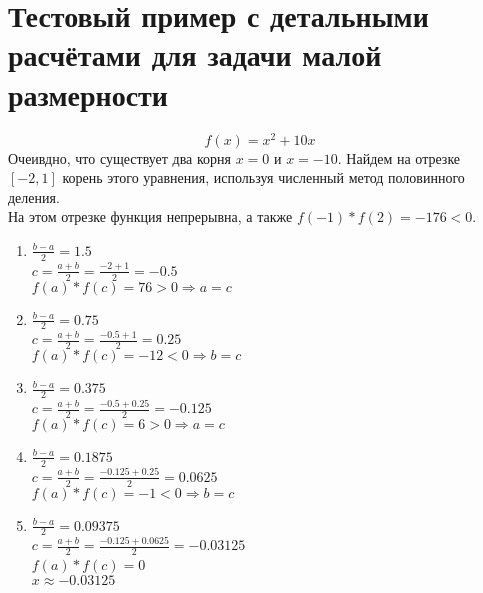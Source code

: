 \documentclass{article}
\begin{document}
	\section{Тестовый пример с детальными расчётами для задачи малой размерности}
	$$f(x)=x^2 + 10x$$
	Очеивдно, что существует два корня $x = 0$ и $x = -10$. Найдем на отрезке $[-2,1]$ корень этого уравнения, используя численный метод половинного деления. 
	~\\
	На этом отрезке функция непрерывна, а также $f(-1)*f(2) = -176 < 0$.
	~\\
	\begin{enumerate}
		\item $\frac{b-a}{2} = 1.5$
		~\\
		$c=\frac{a + b}{2}=\frac{-2 + 1}{2} = -0.5$
		~\\
		$f(a)*f(c) = 76 > 0 \Rightarrow a = c$
		\item $\frac{b-a}{2} = 0.75$
		~\\
		$c=\frac{a + b}{2}=\frac{-0.5 + 1}{2} = 0.25$
		~\\
		$f(a)*f(c) = -12 < 0 \Rightarrow b = c$
		\item $\frac{b - a}{2} = 0.375$
		~\\
		$c=\frac{a + b}{2}=\frac{-0.5 + 0.25}{2} = -0.125$
		~\\
		$f(a)*f(c) = 6 > 0 \Rightarrow a = c$
		\item $\frac{b - a}{2} = 0.1875$
		~\\
		$c=\frac{a + b}{2}=\frac{-0.125 + 0.25}{2} = 0.0625$
		~\\
		$f(a)*f(c) = -1 < 0 \Rightarrow b = c$
		\item $\frac{b - a}{2} = 0.09375$
		~\\
		$c=\frac{a + b}{2}=\frac{-0.125 + 0.0625}{2} = -0.03125$
		~\\
		$f(a)*f(c) = 0$
		~\\
		$x \approx -0.03125$		
	\end{enumerate}
	
\end{document}
